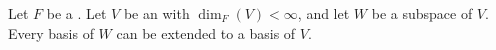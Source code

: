 \begin{lemma} \label{lemma:basis_of_subspace_of_finite_dimensional_vector_space_extends_to_basis_of_ambient_space}
    Let $F$ be a . Let $V$ be an  with $\dim_F(V) < \infty$, and let $W$ be a subspace of $V$. Every basis of $W$ can be extended to a basis of $V$.
\end{lemma}
